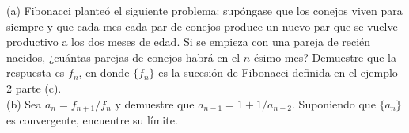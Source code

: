 \item (a) Fibonacci planteó el siguiente problema: supóngase que los conejos viven para siempre y que cada mes cada par de conejos produce un nuevo par que se vuelve productivo a los dos meses de edad. Si se empieza con una pareja de recién nacidos, ¿cuántas parejas de conejos habrá en el $n$-ésimo mes? Demuestre que la respuesta es $f_n$, en donde $\{f_n\}$ es la sucesión de Fibonacci definida en el ejemplo 2 parte (c). \\
    (b) Sea $a_n = f_{n+1}/f_n$ y demuestre que $a_{n-1} = 1 + 1/a_{n-2}$. Suponiendo que $\{a_n\}$ es convergente, encuentre su límite.

